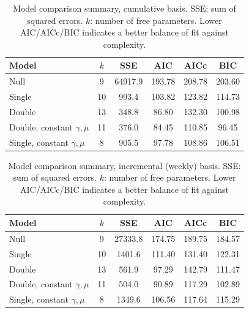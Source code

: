 \begin{table}[H]
    \centering
    \small
    \caption{Model comparison summary, cumulative basis. SSE: sum of squared errors. $k$: number of free parameters. Lower AIC/AICc/BIC indicates a better balance of fit against complexity.}
    \begin{tabular}{lccccc}
        \toprule
        \textbf{Model} & \textbf{$k$} & \textbf{SSE} & \textbf{AIC} & \textbf{AICc} & \textbf{BIC} \\
        \midrule
        Null & 9 & 64917.9 & 193.78 & 208.78 & 203.60 \\
        Single & 10 & 993.4 & 103.82 & 123.82 & 114.73 \\
        Double & 13 & 348.8 & 86.80 & 132.30 & 100.98 \\
        Double, constant $\gamma,\mu$ & 11 & 376.0 & 84.45 & 110.85 & 96.45 \\
        Single, constant $\gamma,\mu$ & 8 & 905.5 & 97.78 & 108.86 & 106.51 \\
        \bottomrule
    \end{tabular}
    \label{tab:model_comparison_summary_cum}
\end{table}

\begin{table}[H]
    \centering
    \small
    \caption{Model comparison summary, incremental (weekly) basis. SSE: sum of squared errors. $k$: number of free parameters. Lower AIC/AICc/BIC indicates a better balance of fit against complexity.}
    \begin{tabular}{lccccc}
        \toprule
        \textbf{Model} & \textbf{$k$} & \textbf{SSE} & \textbf{AIC} & \textbf{AICc} & \textbf{BIC} \\
        \midrule
        Null & 9 & 27333.8 & 174.75 & 189.75 & 184.57 \\
        Single & 10 & 1401.6 & 111.40 & 131.40 & 122.31 \\
        Double & 13 & 561.9 & 97.29 & 142.79 & 111.47 \\
        Double, constant $\gamma,\mu$ & 11 & 504.0 & 90.89 & 117.29 & 102.89 \\
        Single, constant $\gamma,\mu$ & 8 & 1349.6 & 106.56 & 117.64 & 115.29 \\
        \bottomrule
    \end{tabular}
    \label{tab:model_comparison_summary_incr}
\end{table}